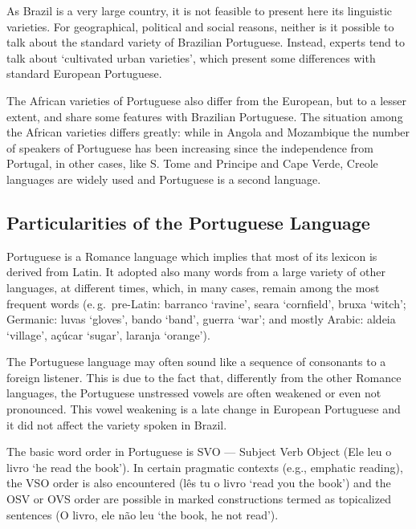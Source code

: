 \begin{multicols}{2}
As Brazil is a very large country, it is not feasible to present here its linguistic varieties. For geographical, political and social reasons, neither is it possible to talk about the standard variety of Brazilian Portuguese. Instead, experts tend to talk about ‘cultivated urban varieties’, which present some differences with standard European Portuguese. 

The African varieties of Portuguese also differ from the European, but to a lesser extent, and share some features with Brazilian Portuguese. The situation among the African varieties differs greatly: while in Angola and Mozambique the number of speakers of Portuguese has been increasing since the independence from Portugal, in other cases, like S. Tome and Principe and Cape Verde, Creole languages are widely used and Portuguese is a second language.

\subsection{Particularities of the Portuguese Language}

 Portuguese is a Romance language\cite{cardeira} which implies that most of its lexicon is derived from Latin. It adopted also many words from a large variety of other languages, at different times, which, in many cases, remain among the most frequent words (e.\,g.~pre-Latin: barranco ‘ravine’, seara ‘cornfield’, bruxa ‘witch’; Germanic: luvas ‘gloves’, bando ‘band’, guerra ‘war’; and mostly Arabic: aldeia ‘village’, açúcar ‘sugar’, laranja ‘orange’).


The Portuguese language may often sound like a sequence of consonants to a foreign listener. This is due to the fact that, differently from the other Romance languages, the Portuguese unstressed vowels are often weakened or even not pronounced. This vowel weakening is a late change in European Portuguese and it did not affect the variety spoken in Brazil.

The basic word order in Portuguese is SVO — Subject Verb Object (Ele leu o livro ‘he read the book'). In certain pragmatic contexts (e.g., emphatic reading), the VSO order is also encountered (lês tu o livro ‘read you the book’) and the OSV or OVS order are possible in marked constructions termed as topicalized sentences (O livro, ele não leu ‘the book, he not read’).


\end{multicols}
